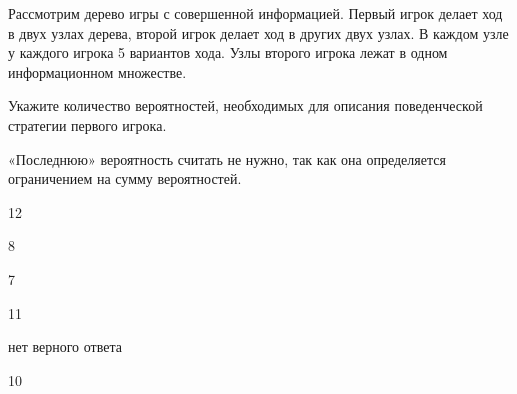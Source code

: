 
\begin{question}
Рассмотрим дерево игры с совершенной информацией. Первый игрок делает
ход в двух узлах дерева, второй игрок делает ход в других двух узлах. В
каждом узле у каждого игрока 5 вариантов хода. Узлы второго игрока лежат
в одном информационном множестве.

Укажите количество вероятностей, необходимых для описания поведенческой
стратегии первого игрока.

«Последнюю» вероятность считать не нужно, так как она определяется
ограничением на сумму вероятностей.
\begin{answerlist}
  \item 12
  \item 8
  \item 7
  \item 11
  \item нет верного ответа
  \item 10
\end{answerlist}
\end{question}


